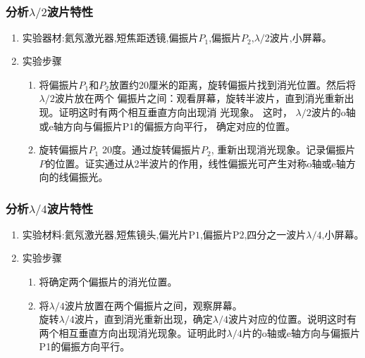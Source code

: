 \documentclass[dvipsnames, svgnames,a4paper,11pt]{article}
\begin{document}
	\subsubsection{分析$\lambda/2$波片特性}
\begin{enumerate}
	
	\item $\text{实验器材:氦氖激光器,短焦距透镜,偏振片$P_1$,偏振片$P_2$,}\lambda/2\text{波片,小屏幕。}$
	\item 实验步骤


	\begin{enumerate}
		\item  将偏振片$P_1$和$P_2$放置约20厘米的距离，旋转偏振片找到消光位置。然后将$\lambda/2$波片放在两个
		偏振片之间：观看屏幕，旋转半波片，直到消光重新出现。证明这时有两个相互垂直方向出现消
		光现象。 这时， $\lambda/2$波片的o轴或e轴方向与偏振片P1的偏振方向平行， 确定对应的位置。
		\item 旋转偏振片$P_{1}$ 20度。通过旋转偏振片$P_{2}$, 重新出现消光现象。记录偏振片$P$的位置。证实通过从2半波片的作用，线性偏振光可产生对称o轴或e轴方向的线偏振光。
	\end{enumerate}




\end{enumerate}
\subsubsection{分析$\lambda/4$波片特性}
\begin{enumerate}
	
	\item$\text{实验材料:氦氖激光器,短焦镜头,偏光片P1,偏振片P2,四分之一波片}\lambda/4\text{,小屏幕。}$
	\item 实验步骤


	\begin{enumerate}
		\item  将确定两个偏振片的消光位置。
		\item 将$\lambda/4$波片放置在两个偏振片之间，观察屏幕。\\
		旋转$\lambda/4$波片，直到消光重新出现，确定$\lambda/4$波片对应的位置。说明这时有两个相互垂直方向出现消光现象。证明此时$\lambda/4$片的o轴或e轴方向与偏振片P1的偏振方向平行。
		
	\end{enumerate}




\end{enumerate}
\end{document}
